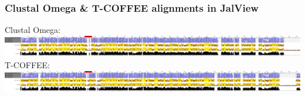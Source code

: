 \documentclass[table]{beamer}
\begin{document}
\begin{frame}[fragile]
\frametitle{Clustal Omega \& T-COFFEE alignments in JalView}
\begin{center}
Clustal Omega: \\
\includegraphics[width=\textwidth]{images/glucanase_clustalo.png} \\
T-COFFEE: \\
\includegraphics[width=\textwidth]{images/glucanase_tcoffee.png}
\end{center}
\end{frame}
\end{document}
